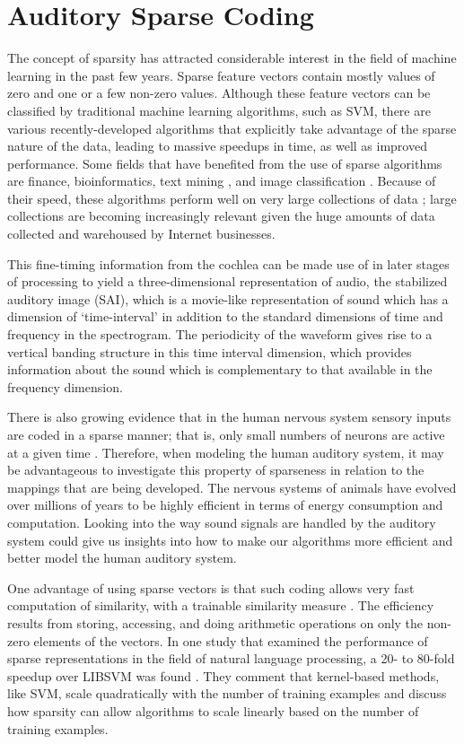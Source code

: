 \documentclass[12pt,oneside]{book}
\begin{document}
\section{Auditory Sparse Coding}

The concept of sparsity has attracted considerable interest in the
field of machine learning in the past few years.  Sparse feature
vectors contain mostly values of zero and one or a few non-zero
values.  Although these feature vectors can be classified by
traditional machine learning algorithms, such as SVM, there are various
recently-developed algorithms that explicitly take advantage of
the sparse nature of the data, leading to massive speedups in time, as
well as improved performance.  Some fields that have benefited from
the use of sparse algorithms are finance, bioinformatics, text mining
\cite{balakrishnan2008}, and image classification \cite{chechik2010}.
Because of their speed, these algorithms perform well on very large
collections of data \cite{bottou2007}; large collections are becoming 
increasingly relevant given the huge amounts of data collected and warehoused 
by Internet businesses.

This fine-timing information from the cochlea can be made use of in
later stages of processing to yield a three-dimensional representation
of audio, the stabilized auditory image (SAI)\cite{patterson2000},
which is a movie-like representation of sound which has a dimension of
`time-interval' in addition to the standard dimensions of time and
frequency in the spectrogram. The periodicity of the waveform gives
rise to a vertical banding structure in this time interval dimension,
which provides information about the sound which is complementary to
that available in the frequency dimension.

There is also growing evidence that in the human nervous
system sensory inputs are coded in a sparse manner; that is, only
small numbers of neurons are active at a given time
\cite{olshausen2004}.  Therefore, when modeling the human auditory
system, it may be advantageous to investigate this property of
sparseness in relation to the mappings that are being developed. The
nervous systems of animals have evolved over millions of years to be
highly efficient in terms of energy consumption and computation. 
Looking into the way sound signals are handled by the auditory
system could give us insights into how to make our algorithms more
efficient and better model the human auditory system.

One advantage of using sparse vectors is that such coding allows very fast
computation of similarity, with a trainable similarity measure 
\cite{chechik2010}. The efficiency results from storing, accessing, and doing 
arithmetic operations on only the non-zero elements of the vectors.   
In one study that examined the performance of sparse
representations in the field of natural language processing, a 20- to
80-fold speedup over LIBSVM was found \cite{haffner2006}.  They
comment that kernel-based methods, like SVM, scale quadratically with
the number of training examples and discuss how sparsity can allow
algorithms to scale linearly based on the number of training examples.
\end{document}
